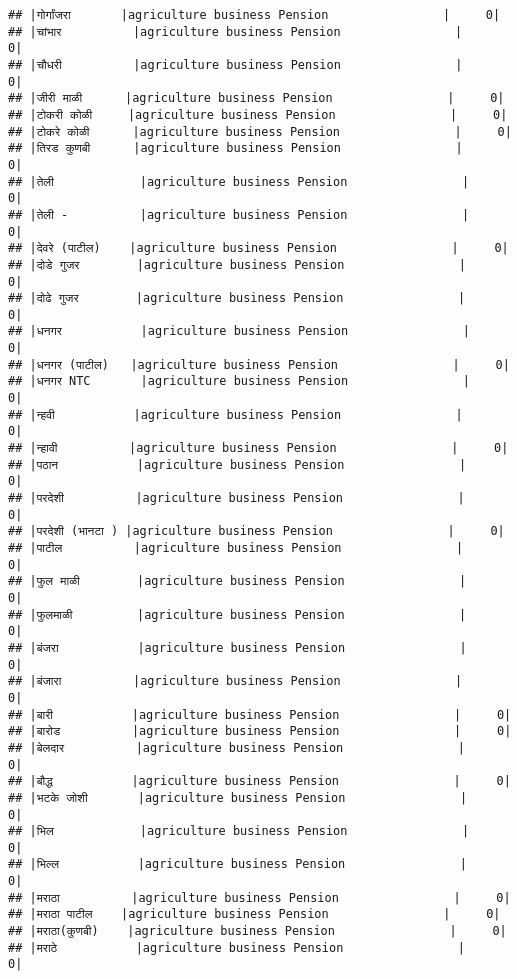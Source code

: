 \documentclass[
]{article}
\begin{document}
\begin{verbatim}
## |गोर्गांजरा       |agriculture business Pension                |     0|
## |चांभार          |agriculture business Pension                |     0|
## |चौधरी          |agriculture business Pension                |     0|
## |जीरी माळी      |agriculture business Pension                |     0|
## |टोकरी कोळी     |agriculture business Pension                |     0|
## |टोकरे कोळी      |agriculture business Pension                |     0|
## |तिरड कुणबी      |agriculture business Pension                |     0|
## |तेली            |agriculture business Pension                |     0|
## |तेली -          |agriculture business Pension                |     0|
## |देवरे (पाटील)    |agriculture business Pension                |     0|
## |दोडे गुजर        |agriculture business Pension                |     0|
## |दोढे गुजर        |agriculture business Pension                |     0|
## |धनगर           |agriculture business Pension                |     0|
## |धनगर (पाटील)   |agriculture business Pension                |     0|
## |धनगर NTC       |agriculture business Pension                |     0|
## |न्हवी           |agriculture business Pension                |     0|
## |न्हावी          |agriculture business Pension                |     0|
## |पठान           |agriculture business Pension                |     0|
## |परदेशी          |agriculture business Pension                |     0|
## |परदेशी (भानटा ) |agriculture business Pension                |     0|
## |पाटील          |agriculture business Pension                |     0|
## |फुल माळी        |agriculture business Pension                |     0|
## |फुलमाळी         |agriculture business Pension                |     0|
## |बंजरा           |agriculture business Pension                |     0|
## |बंजारा          |agriculture business Pension                |     0|
## |बारी           |agriculture business Pension                |     0|
## |बारोड          |agriculture business Pension                |     0|
## |बेलदार          |agriculture business Pension                |     0|
## |बौद्ध           |agriculture business Pension                |     0|
## |भटके जोशी       |agriculture business Pension                |     0|
## |भिल            |agriculture business Pension                |     0|
## |भिल्ल           |agriculture business Pension                |     0|
## |मराठा          |agriculture business Pension                |     0|
## |मराठा पाटील    |agriculture business Pension                |     0|
## |मराठा(कुणबी)    |agriculture business Pension                |     0|
## |मराठे           |agriculture business Pension                |     0|

\end{verbatim}
\end{document}

